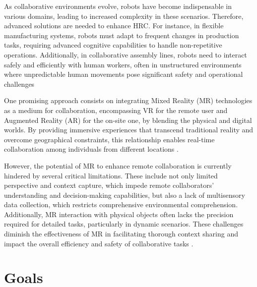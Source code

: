 As collaborative environments evolve, robots have become indispensable in various domains, leading to increased complexity in these scenarios. Therefore, advanced solutions are needed to enhance \ac{HRC}. For instance, in flexible manufacturing systems, robots must adapt to frequent changes in production tasks, requiring advanced cognitive capabilities to handle non-repetitive operations. Additionally, in collaborative assembly lines, robots need to interact safely and efficiently with human workers, often in unstructured environments where unpredictable human movements pose significant safety and operational challenges \cite{Ogenyi2021, Aaltonen2019, doi:10.1177/0018720814565188}

One promising approach consists on integrating Mixed Reality (\ac{MR}) technologies as a medium for collaboration, encompassing \ac{VR} for the remote user and Augmented Reality (\ac{AR}) for the on-site one, by blending the physical and digital worlds. By providing immersive experiences that transcend traditional reality and overcome geographical constraints, this relationship enables real-time collaboration among individuals from different locations \cite{whatismixedreality, Mayer2023}.

However, the potential of \ac{MR} to enhance remote collaboration is currently hindered by several critical limitations. These include not only limited perspective and context capture, which impede remote collaborators' understanding and decision-making capabilities, but also a lack of multisensory data collection, which restricts comprehensive environmental comprehension. 
Additionally, \ac{MR} interaction with physical objects often lacks the precision required for detailed tasks, particularly in dynamic scenarios. These challenges diminish the effectiveness of \ac{MR} in facilitating thorough context sharing and impact the overall efficiency and safety of 
collaborative tasks \cite{doi:10.5772/5664}.

\FloatBarrier

\section{Goals}
\label{section:Goals}
% 

